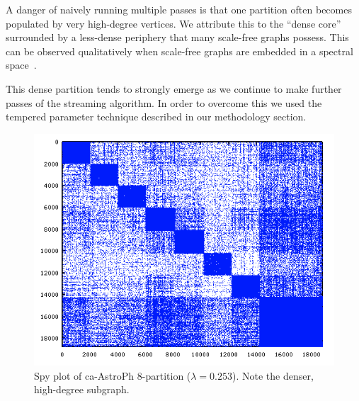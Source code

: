 A danger of naively running multiple passes is that one partition often becomes populated by very high-degree vertices. 
We attribute this to the ``dense core'' surrounded by a less-dense periphery that many scale-free graphs possess.
This can be observed qualitatively when scale-free graphs are embedded in a spectral space~\cite{Lang04findinggood}.

This dense partition tends to strongly emerge as we continue to make further passes of the streaming algorithm.
In order to overcome this we used the tempered parameter technique described in our methodology section. 

\begin{figure}[h!]
\centering
  \includegraphics[width=0.8\columnwidth]{figures/astroPh8.png}
  \caption{Spy plot of ca-AstroPh 8-partition ($\lambda=0.253$). Note the denser, high-degree subgraph.}
  \label{fig:dense}
\end{figure}


